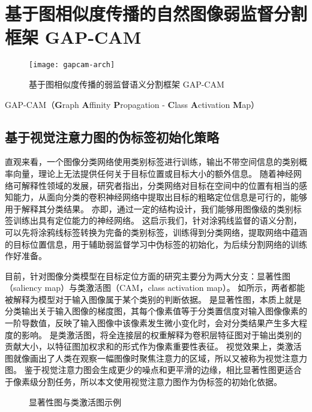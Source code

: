 \section{基于图相似度传播的自然图像弱监督分割框架 GAP-CAM}\label{sec:gapcam}
\begin{figure}[h]
\centering
\texttt{[image: gapcam-arch]}
\caption{基于图相似度传播的弱监督语义分割框架 GAP-CAM}
\label{fig:gapcam-arch}
\end{figure}
GAP-CAM（\textbf{G}raph \textbf{A}ffinity \textbf{P}ropagation - \textbf{C}lass \textbf{A}ctivation \textbf{M}ap）
\subsection{基于视觉注意力图的伪标签初始化策略}
\label{subsec:cam}
直观来看，一个图像分类网络使用类别标签进行训练，输出不带空间信息的类别概率向量，理论上无法提供任何关于目标位置或目标大小的额外信息。
随着神经网络可解释性领域的发展，研究者指出，分类网络对目标在空间中的位置有相当的感知能力，从面向分类的卷积神经网络中提取出目标的粗略定位信息是可行的，能够用于解释其分类结果\cite{oquab2015object}。
亦即，通过一定的结构设计，我们能够用图像级的类别标签训练出具有定位能力的神经网络。
这启示我们，针对涂鸦线监督的语义分割，可以先将涂鸦线标签转换为完备的类别标签，训练得到分类网络，提取网络中蕴涵的目标位置信息，用于辅助弱监督学习中伪标签的初始化，为后续分割网络的训练作好准备。
\par
目前，针对图像分类模型在目标定位方面的研究主要分为两大分支：显著性图（saliency map）与类激活图（CAM，class activation map）。
如所示，两者都能被解释为模型对于输入图像属于某个类别的判断依据。
是显著性图，本质上就是分类输出关于输入图像的梯度图，其每个像素值等于分类置信度对输入图像像素的一阶导数值，反映了输入图像中该像素发生微小变化时，会对分类结果产生多大程度的影响\cite{simonyan2013deep}。
是类激活图，将全连接层的权重解释为卷积层特征图对于输出类别的贡献大小，以特征图加权求和的形式作为像素重要性表征\cite{zhou2016learning}。
视觉效果上，类激活图就像画出了人类在观察一幅图像时聚焦注意力的区域，所以又被称为视觉注意力图。
鉴于视觉注意力图会生成更少的噪点和更平滑的边缘，相比显著性图更适合于像素级分割任务，所以本文使用视觉注意力图作为伪标签的初始化依据。
\par
\begin{figure}[h]
\centering
{}
\hfil
{}
\hfil
{}
\caption{显著性图与类激活图示例}
\label{fig:saliency-cam}
\end{figure}
